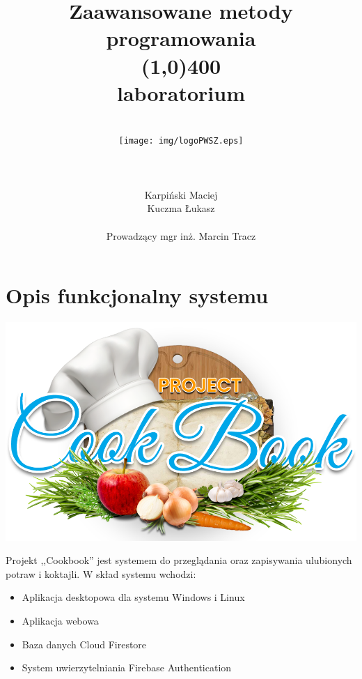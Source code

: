 \documentclass[12pt,a4paper]{article}
\author{
	\\\texttt{[image: img/logoPWSZ.eps]} \\\\\\\\
	\hfill Karpiński Maciej\\
	\hfill Kuczma Łukasz\\\\
	\hfill Prowadzący mgr inż. Marcin Tracz
	}
\title{\textbf{Zaawansowane metody programowania}\\\line(1,0){400}\\\textbf{laboratorium}}
\date{}
\begin{document}
	\maketitle
	\thispagestyle{fancy}
	\fancyhf{}
	\rhead{\textcolor{gray}{\footnotesize Państwowa Wyższa Szkoła Zawodowa im. Witelona w Legnicy\\Informatyka, rok III\\Semestr letni 2020/2021}}	
	\renewcommand{\headrulewidth}{0pt}
	\clearpage

	\pagestyle{fancy}
	\rfoot{\thepage}	
	\tableofcontents
	\newpage

	\section{Opis funkcjonalny systemu}	
	\begin{center}
		\includegraphics[width=0.7\linewidth]{img/logo.png}
	\end{center}
	
		
		\indent Projekt ,,Cookbook'' jest systemem do przeglądania oraz zapisywania ulubionych potraw i koktajli. W skład systemu wchodzi:
		\begin{itemize}
			\item Aplikacja desktopowa dla systemu Windows i Linux
			\item Aplikacja webowa
			\item Baza danych Cloud Firestore
			\item System uwierzytelniania Firebase Authentication\\\\
		\end{itemize}
		
\end{document}
